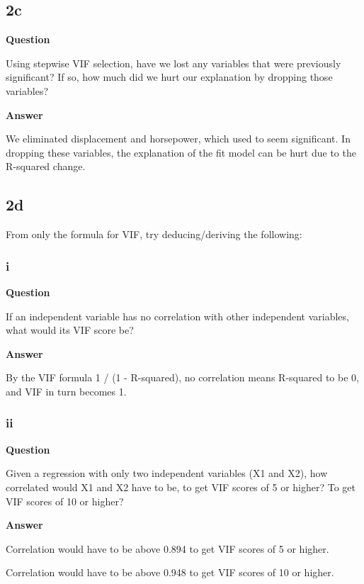 \documentclass[
]{article}
\begin{document}
\hypertarget{c}{%
\subsection{2c}\label{c}}

\textbf{Question}

Using stepwise VIF selection, have we lost any variables that were
previously significant? If so, how much did we hurt our explanation by
dropping those variables?

\textbf{Answer}

We eliminated displacement and horsepower, which used to seem
significant. In dropping these variables, the explanation of the fit
model can be hurt due to the R-squared change.

\hypertarget{d}{%
\subsection{2d}\label{d}}

From only the formula for VIF, try deducing/deriving the following:

\hypertarget{i-3}{%
\subsubsection{i}\label{i-3}}

\textbf{Question}

If an independent variable has no correlation with other independent
variables, what would its VIF score be?

\textbf{Answer}

By the VIF formula 1 / (1 - R-squared), no correlation means R-squared
to be 0, and VIF in turn becomes 1.

\hypertarget{ii-3}{%
\subsubsection{ii}\label{ii-3}}

\textbf{Question}

Given a regression with only two independent variables (X1 and X2), how
correlated would X1 and X2 have to be, to get VIF scores of 5 or higher?
To get VIF scores of 10 or higher?

\textbf{Answer}

Correlation would have to be above 0.894 to get VIF scores of 5 or
higher.

Correlation would have to be above 0.948 to get VIF scores of 10 or
higher.
\end{document}
